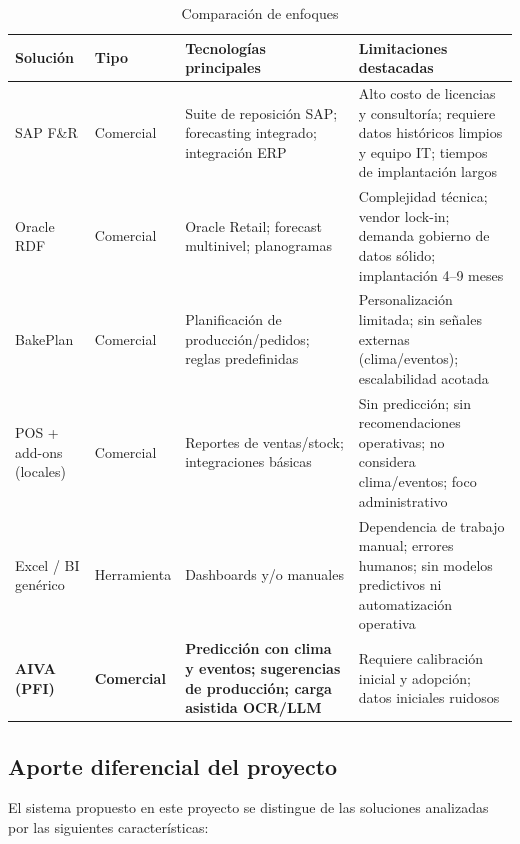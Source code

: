 \begin{table}[t]
    \centering
    \renewcommand{\arraystretch}{1.3}
    \caption{Comparación de enfoques}
    \label{tab:comparacion}
    \begin{tabular}{|p{2.9cm}|p{2cm}|p{3cm}|p{5cm}|}
        \hline
        \textbf{Solución} & \textbf{Tipo} & \textbf{Tecnologías principales} & \textbf{Limitaciones destacadas} \\
        \hline
        SAP F\&R & Comercial & Suite de reposición SAP; forecasting integrado; integración ERP & Alto costo de licencias y consultoría; requiere datos históricos limpios y equipo IT; tiempos de implantación largos \\
        \hline
        Oracle RDF & Comercial  & Oracle Retail; forecast multinivel; planogramas & Complejidad técnica; vendor lock-in; demanda gobierno de datos sólido; implantación 4–9 meses \\
        \hline
        BakePlan & Comercial  & Planificación de producción/pedidos; reglas predefinidas & Personalización limitada; sin señales externas (clima/eventos); escalabilidad acotada \\
        \hline
        POS + add-ons (locales) & Comercial  & Reportes de ventas/stock; integraciones básicas & Sin predicción; sin recomendaciones operativas; no considera clima/eventos; foco administrativo \\
        \hline
        Excel / BI genérico & Herramienta & Dashboards y/o manuales & Dependencia de trabajo manual; errores humanos; sin modelos predictivos ni automatización operativa \\
        \hline
        \textbf{AIVA (PFI)} & \textbf{Comercial} & \textbf{Predicción con clima y eventos; sugerencias de producción; carga asistida OCR/LLM} & Requiere calibración inicial y adopción; datos iniciales ruidosos \\
        \hline
    \end{tabular}
\end{table}



\subsection{Aporte diferencial del proyecto}

El sistema propuesto en este proyecto se distingue de las soluciones analizadas por las siguientes características:

